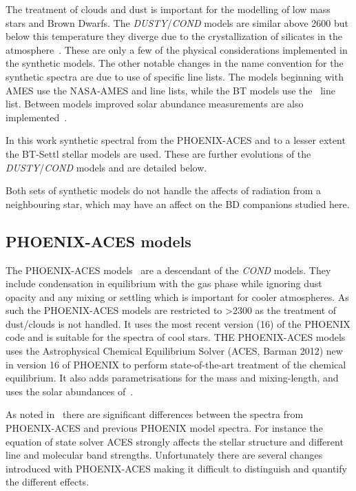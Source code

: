 The treatment of clouds and dust is important for the modelling of low mass stars and Brown Dwarfs.
The \emph{DUSTY}/\emph{COND} models are similar above 2600\K{} but below this temperature they diverge due to the crystallization of silicates in the atmosphere~\citep{allard_limiting_2001}.
These are only a few of the physical considerations implemented in the synthetic models.
The other notable changes in the name convention for the synthetic spectra are due to use of specific line lists.
The models beginning with {AMES} use the {NASA-AMES}  and  line lists, while the {BT} models use the~\citet{barber_highaccuracy_2006}  line list.
Between models improved solar abundance measurements are also implemented~\citep[][]{asplund_chemical_2009}.

In this work synthetic spectral from the {PHOENIX-ACES} and to a lesser extent the {BT-Settl} stellar models are used.
These are further evolutions of the \emph{DUSTY}/\emph{COND} models and are detailed below.

Both sets of synthetic models do not handle the affects of radiation from a neighbouring star, which may have an affect on the BD companions studied here.

\subsection{{PHOENIX-ACES} models}
\label{subsec:phoenix_aces}

The {PHOENIX-ACES} models~\citep{husser_new_2013} are a descendant of the \emph{COND} models.
They include condensation in equilibrium with the gas phase while ignoring dust opacity and any mixing or settling which is important for cooler atmospheres.
As such the {PHOENIX-ACES} models are restricted to \Teff{}>2300\K{} as the treatment of dust/clouds is not handled.
It uses the most recent version (16) of the {PHOENIX} code and is suitable for the spectra of cool stars.
THE {PHOENIX-ACES} models uses the Astrophysical Chemical Equilibrium Solver (ACES, Barman 2012) new in version 16 of {PHOENIX} to perform state-of-the-art treatment of the chemical equilibrium.
It also adds parametrisations for the mass and mixing-length, and uses the solar abundances of~\citet{asplund_chemical_2009}.

As noted in~\citep{husser_new_2013} there are significant differences between the spectra from {PHOENIX-ACES} and previous {PHOENIX} model spectra.
For instance the equation of state solver ACES strongly affects the stellar structure and different line and molecular band strengths.
Unfortunately there are several changes introduced with {PHOENIX-ACES} making it difficult to distinguish and quantify the different effects.

